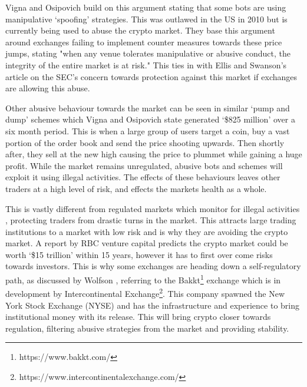 Vigna and Osipovich \cite{ART:VIGNA:2018} build on this argument stating that some bots are using manipulative `spoofing' strategies. This was outlawed in the US in 2010 but is currently being used to abuse the crypto market. They base this argument around exchanges failing to implement counter measures towards these price jumps, stating "when any venue tolerates manipulative or abusive conduct, the integrity of the entire market is at risk." This ties in with Ellis and Swanson's article \cite{ART:ELLIS:2018} on the SEC's concern towards protection against this market if exchanges are allowing this abuse. 

Other abusive behaviour towards the market can be seen in similar `pump and dump' schemes which Vigna and Osipovich \cite{ART:VIGNA:2018} state generated `\$825 million' over a six month period. This is when a large group of users target a coin, buy a vast portion of the order book and send the price shooting upwards. Then shortly after, they sell at the new high causing the price to plummet while gaining a huge profit. While the market remains unregulated, abusive bots and schemes will exploit it using illegal activities. The effects of these behaviours leaves other traders at a high level of risk, and effects the markets health as a whole.

This is vastly different from regulated markets which monitor for illegal activities \cite{ART:VIGNA:2018}, protecting traders from drastic turns in the market. This attracts large trading institutions to a market with low risk and is why they are avoiding the crypto market. A report by RBC venture capital predicts the crypto market could be worth `\$15 trillion' within 15 years, however it has to first over come risks towards investors. This is why some exchanges are heading down a self-regulatory path, as discussed by Wolfson \cite{ART:WOLFSON:2018}, referring to the Bakkt\footnote{https://www.bakkt.com/} exchange which is in development by Intercontinental Exchange\footnote{https://www.intercontinentalexchange.com/}. This company spawned the New York Stock Exchange (NYSE) and has the infrastructure and experience to bring institutional money with its release. This will bring crypto closer towards regulation, filtering abusive strategies from the market and providing stability.

